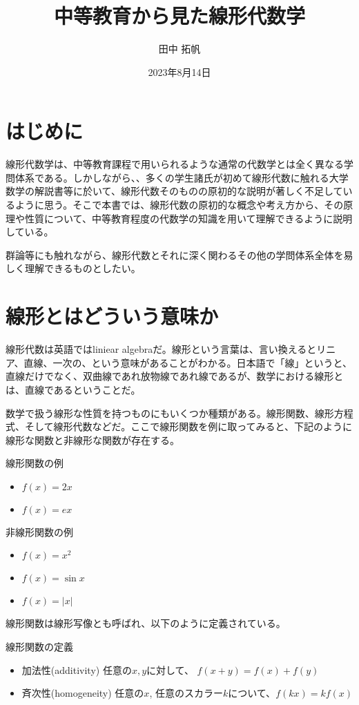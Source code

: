 \documentclass[a4j]{jsarticle}
\title{中等教育から見た線形代数学}
\author{田中 拓帆}
\date{2023年8月14日}
\begin{document}
	\maketitle
	\section{はじめに}
	線形代数学は、中等教育課程で用いられるような通常の代数学とは全く異なる学問体系である。しかしながら、、多くの学生諸氏が初めて線形代数に触れる大学数学の解説書等に於いて、線形代数そのものの原初的な説明が著しく不足しているように思う。そこで本書では、線形代数の原初的な概念や考え方から、その原理や性質について、中等教育程度の代数学の知識を用いて理解できるように説明している。
	
	群論等にも触れながら、線形代数とそれに深く関わるその他の学問体系全体を易しく理解できるものとしたい。
	\section{線形とはどういう意味か}
	線形代数は英語ではliniear algebraだ。線形という言葉は、言い換えるとリニア、直線、一次の、という意味があることがわかる。日本語で「線」というと、直線だけでなく、双曲線であれ放物線であれ線であるが、数学における線形とは、直線であるということだ。
	
	数学で扱う線形な性質を持つものにもいくつか種類がある。線形関数、線形方程式、そして線形代数などだ。ここで線形関数を例に取ってみると、下記のように線形な関数と非線形な関数が存在する。
	\begin{itembox}[l]{線形関数の例}
		\begin{itemize}
			\item $f(x)=2x$
			\item $f(x)=ex$
		\end{itemize}
	\end{itembox}
	\begin{itembox}[l]{非線形関数の例}
		\begin{itemize}
			\item $f(x)=x^2$
			\item $f(x)=\sin x$
			\item $f(x)=|x|$
		\end{itemize}
	\end{itembox}
	線形関数は線形写像とも呼ばれ、以下のように定義されている。
	\begin{itembox}[l]{線形関数の定義}
		\begin{itemize}
			\item 加法性(additivity) 任意の$x,y$に対して、 $f(x+y)=f(x)+f(y)$
			\item 斉次性(homogeneity) 任意の$x$, 任意のスカラー$k$について、$f(kx)=kf(x)$
		\end{itemize}
	\end{itembox}
\end{document}
